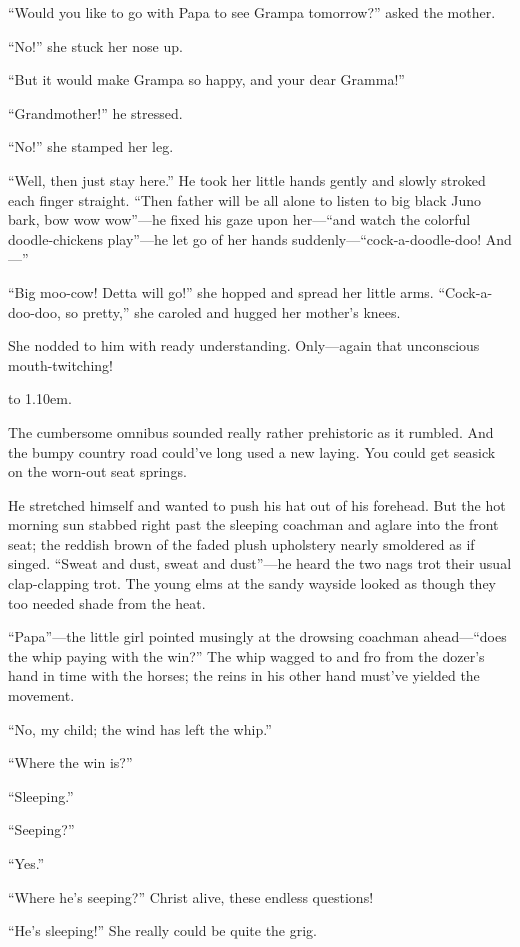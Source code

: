 \documentclass[12pt,a4paper]{article}
\renewcommand{\dotfill}{
  \leavevmode\cleaders\hbox to 1.10em{\hss .\hss }\hfill\kern0pt }
\begin{document}
“Would you like to go with Papa to see Grampa tomorrow?” asked the mother.

“No!” she stuck her nose up.

“But it would make Grampa so happy, and your dear Gramma!”

“Grandmother!” he stressed.

“No!” she stamped her leg.

“Well, then just stay here.” He took her little hands gently and slowly stroked each finger straight. “Then father will be all alone to listen to big black Juno bark, bow wow wow”—he fixed his gaze upon her—“and watch the colorful doodle-chickens play”—he let go of her hands suddenly—“cock-a-doodle-doo! And—”

“Big moo-cow! Detta will go!” she hopped and spread her little arms. “Cock-a-doo-doo, so pretty,” she caroled and hugged her mother’s knees.

She nodded to him with ready understanding. Only—again that unconscious mouth-twitching!

\null
\noindent\dotfill

\null

The cumbersome omnibus sounded really rather prehistoric as it rumbled. And the bumpy country road could’ve long used a new laying. You could get seasick on the worn-out seat springs.

He stretched himself and wanted to push his hat out of his forehead. But the hot morning sun stabbed right past the sleeping coachman and aglare into the front seat; the reddish brown of the faded plush upholstery nearly smoldered as if singed. “Sweat and dust, sweat and dust”—he heard the two nags trot their usual clap-clapping trot. The young elms at the sandy wayside looked as though they too needed shade from the heat.

“Papa”—the little girl pointed musingly at the drowsing coachman ahead—“does the whip paying with the win?” The whip wagged to and fro from the dozer’s hand in time with the horses; the reins in his other hand must’ve yielded the movement.

“No, my child; the wind has left the whip.”

“Where the win is?”

“Sleeping.”

“Seeping?”

“Yes.”

“Where he’s seeping?” Christ alive, these endless questions!

“He’s sleeping!” She really could be quite the grig.
\end{document}
